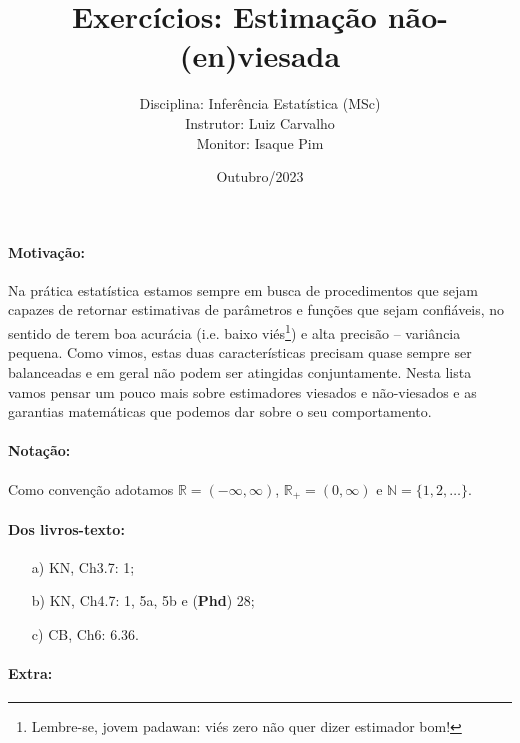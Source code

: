 \documentclass[a4paper,10pt, notitlepage]{report}
\title{Exercícios: Estimação não-(en)viesada}
\author{Disciplina: Inferência Estatística (MSc)  \\ Instrutor: Luiz Carvalho \\ Monitor: Isaque Pim}
\date{Outubro/2023}
\newcommand{\rpl}{\mathbb{R}_+}
\begin{document}
\maketitle

\paragraph{Motivação:} Na prática estatística estamos sempre em busca de procedimentos que sejam capazes de retornar estimativas de parâmetros e funções que sejam confiáveis, no sentido de terem boa acurácia (i.e. baixo viés\footnote{Lembre-se, jovem padawan: viés zero não quer dizer estimador bom!}) e alta precisão -- variância pequena.
Como vimos, estas duas características precisam quase sempre ser balanceadas e em geral não podem ser atingidas conjuntamente.
Nesta lista vamos pensar um pouco mais sobre estimadores viesados e não-viesados e as garantias matemáticas que podemos dar sobre o seu comportamento.

\paragraph{Notação:} Como convenção adotamos $\mathbb{R} = (-\infty, \infty)$, $\rpl = (0, \infty)$ e $\mathbb{N} = \{1, 2, \ldots \}$.

\paragraph{Dos livros-texto:}

\begin{itemize}
    \item[a)] KN, Ch3.7: 1;
    \item[b)] KN, Ch4.7: 1, 5a, 5b e (\textbf{Phd}) 28;
    \item[c)] CB, Ch6: 6.36.
\end{itemize}

\paragraph{Extra:}
\end{document}
